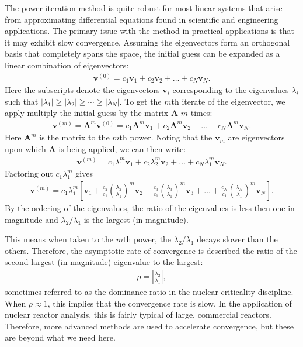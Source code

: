 The power iteration method is quite robust for most linear systems that arise from approximating differential equations found in scientific and engineering applications. The primary issue with the method in practical applications is that it may exhibit slow convergence. Assuming the eigenvectors form an orthogonal basis that completely spans the space, the initial guess can be expanded as a linear combination of eigenvectors:
\begin{align}
  \mathbf{v}^{(0)} = c_1 \mathbf{v}_1 + c_2 \mathbf{v}_2 + \ldots + c_N \mathbf{v}_N .
\end{align}
Here the subscripts denote the eigenvectors $\mathbf{v}_i$ corresponding to the eigenvalues $\lambda_i$ such that $| \lambda_1 | \ge | \lambda_2 | \ge \cdots \ge | \lambda_N |$. To get the $m$th iterate of the eigenvector, we apply multiply the initial guess by the matrix $\mathbf{A}$ $m$ times:
\begin{align}
  \mathbf{v}^{(m)} = \mathbf{A}^m \mathbf{v}^{(0)} = c_1 \mathbf{A}^m \mathbf{v}_1 + c_2 \mathbf{A}^m \mathbf{v}_2 + \ldots + c_N \mathbf{A}^m \mathbf{v}_N .
\end{align}
Here $\mathbf{A}^m$ is the matrix to the $m$th power. Noting that the $\mathbf{v}_m$ are eigenvectors upon which $\mathbf{A}$ is being applied, we can then write:
\begin{align}
  \mathbf{v}^{(m)} = c_1 \lambda_1^m \mathbf{v}_1 + c_2 \lambda_2^m \mathbf{v}_2 + \ldots + c_N \lambda_1^m \mathbf{v}_N .
\end{align}
Factoring out $c_1 \lambda_1^m$ gives
\begin{align}
  \mathbf{v}^{(m)} = c_1 \lambda_1^m \left[ \mathbf{v}_1 + \frac{c_2}{c_1} \left( \frac{\lambda_2}{\lambda_1} \right)^m \mathbf{v}_2 + \frac{c_3}{c_1} \left( \frac{\lambda_3}{\lambda_1} \right)^m \mathbf{v}_3 + \ldots + \frac{c_N}{c_1} \left( \frac{\lambda_N}{\lambda_1} \right)^m\mathbf{v}_N \right].
\end{align}
By the ordering of the eigenvalues, the ratio of the eigenvalues is less then one in magnitude and $\lambda_2 / \lambda_1$ is the largest (in magnitude). 

This means when taken to the $m$th power, the $\lambda_2 / \lambda_1$ decays slower than the others. Therefore, the asymptotic rate of convergence is described the ratio of the second largest (in magnitude) eigenvalue to the largest:
\begin{align}
  \rho = \left| \frac{\lambda_2}{\lambda_1} \right| ,
\end{align}
sometimes referred to as the dominance ratio in the nuclear criticality discipline. When $\rho \approx 1$, this implies that the convergence rate is slow. In the application of nuclear reactor analysis, this is fairly typical of large, commercial reactors. Therefore, more advanced methods are used to accelerate convergence, but these are beyond what we need here.

